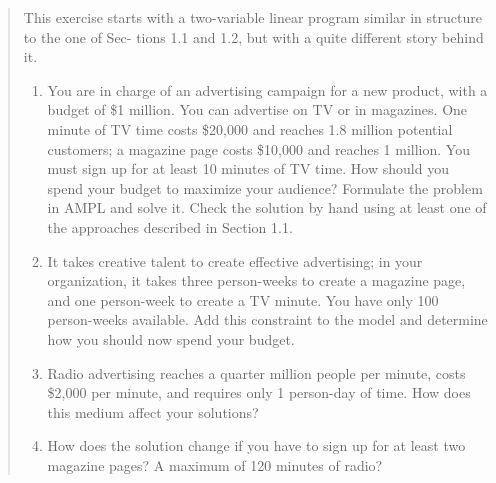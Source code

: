 \documentclass[11pt]{article}
\begin{document}
\begin{enumerate}
\begin{quote}
This exercise starts with a two-variable linear program similar in structure to the one of Sec-
tions 1.1 and 1.2, but with a quite different story behind it.
\begin{enumerate}
\item You are in charge of an advertising campaign for a new product, with a budget of \$1 million.
You can advertise on TV or in magazines. One minute of TV time costs \$20,000 and reaches 1.8
million potential customers; a magazine page costs \$10,000 and reaches 1 million. You must sign
up for at least 10 minutes of TV time. How should you spend your budget to maximize your audience? Formulate the problem in AMPL and solve it. Check the solution by hand using at least one
of the approaches described in Section 1.1.

\item It takes creative talent to create effective advertising; in your organization, it takes three
person-weeks to create a magazine page, and one person-week to create a TV minute. You have
only 100 person-weeks available. Add this constraint to the model and determine how you should
now spend your budget.
\item Radio advertising reaches a quarter million people per minute, costs \$2,000 per minute, and
requires only 1 person-day of time. How does this medium affect your solutions?
\item How does the solution change if you have to sign up for at least two magazine pages? A maximum of 120 minutes of radio?
\end{enumerate}
\end{quote}

\end{enumerate}
\end{document}
